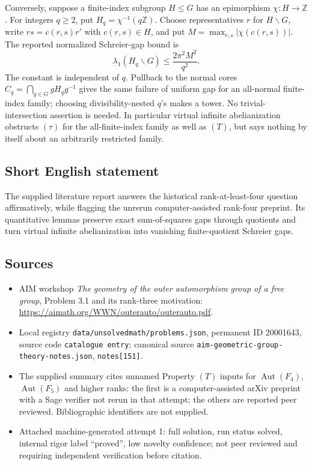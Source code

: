 \documentclass[11pt]{article}
\newcommand{\Z}{\mathbb{Z}}
\begin{document}
Conversely, suppose a finite-index subgroup \(H\le G\) has an epimorphism \(\chi:H\to\Z\). For integers \(q\ge2\), put \(H_q=\chi^{-1}(q\Z)\). Choose representatives \(r\) for \(H\backslash G\), write \(rs=c(r,s)r'\) with \(c(r,s)\in H\), and put \(M=\max_{r,s}|\chi(c(r,s))|\). The reported normalized Schreier-gap bound is
\[
 \lambda_1(H_q\backslash G)\le\frac{2\pi^2M^2}{q^2}.
\]
The constant is independent of \(q\). Pullback to the normal cores \(C_q=\bigcap_{g\in G}gH_qg^{-1}\) gives the same failure of uniform gap for an all-normal finite-index family; choosing divisibility-nested \(q\)'s makes a tower. No trivial-intersection assertion is needed. In particular virtual infinite abelianization obstructs \((\tau)\) for the all-finite-index family as well as \((T)\), but says nothing by itself about an arbitrarily restricted family.
\subsection{Short English statement}
The supplied literature report answers the historical rank-at-least-four question affirmatively, while flagging the unrerun computer-assisted rank-four preprint. Its quantitative lemmas preserve exact sum-of-squares gaps through quotients and turn virtual infinite abelianization into vanishing finite-quotient Schreier gaps.
\subsection{Sources}
\begin{itemize}
\item AIM workshop \emph{The geometry of the outer automorphism group of a free group}, Problem 3.1 and its rank-three motivation: \url{https://aimath.org/WWN/outerauto/outerauto.pdf}.
\item Local registry \texttt{data/unsolvedmath/problems.json}, permanent ID 20001643, source code \texttt{catalogue entry}; canonical source \texttt{aim-geometric-group-theory-notes.json}, \texttt{notes[151]}.
\item The supplied summary cites unnamed Property \((T)\) inputs for \(\operatorname{Aut}(F_4)\), \(\operatorname{Aut}(F_5)\) and higher ranks: the first is a computer-assisted arXiv preprint with a Sage verifier not rerun in that attempt; the others are reported peer reviewed. Bibliographic identifiers are not supplied.
\item Attached machine-generated attempt 1: full solution, run status solved, internal rigor label ``proved'', low novelty confidence; not peer reviewed and requiring independent verification before citation.
\end{itemize}
\end{document}
